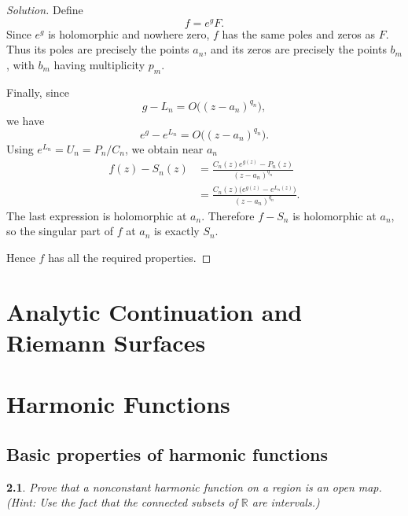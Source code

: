\documentclass[12pt, a4paper]{report}
\theoremstyle{spaced}
\newtheorem{exercise}{}
\newcommand{\setexercise}[1]{\setcounter{exercise}{#1-1}}
\begin{document}
\begin{proof}[Solution]
	Define
	\[
		f=e^gF.
	\]
	Since \(e^g\) is holomorphic and nowhere zero, \(f\) has the same poles
	and zeros as \(F\). Thus its poles are precisely the points \(a_n\), and
	its zeros are precisely the points \(b_m\), with \(b_m\) having
	multiplicity \(p_m\).

	Finally, since
	\[
		g-L_n=O\bigl((z-a_n)^{q_n}\bigr),
	\]
	we have
	\[
		e^g-e^{L_n}
		=
		O\bigl((z-a_n)^{q_n}\bigr).
	\]
	Using \(e^{L_n}=U_n=P_n/C_n\), we obtain near \(a_n\)
	\[
		\begin{aligned}
			f(z)-S_n(z)
			 & =
			\frac{C_n(z)e^{g(z)}-P_n(z)}
			{(z-a_n)^{q_n}} \\
			 & =
			\frac{C_n(z)\bigl(e^{g(z)}-e^{L_n(z)}\bigr)}
			{(z-a_n)^{q_n}}.
		\end{aligned}
	\]
	The last expression is holomorphic at \(a_n\). Therefore
	\(f-S_n\) is holomorphic at \(a_n\), so the singular part of \(f\) at
	\(a_n\) is exactly \(S_n\).

	Hence \(f\) has all the required properties.
\end{proof}

\chapter{Analytic Continuation and Riemann Surfaces}

\chapter{Harmonic Functions}
\section{Basic properties of harmonic functions}
\setexercise{4}
\begin{exercise}
	Prove that a nonconstant harmonic function on a region is an open map.
	(Hint: Use the fact that the connected subsets of $\mathbb{R}$ are intervals.)
\end{exercise}
\end{document}
